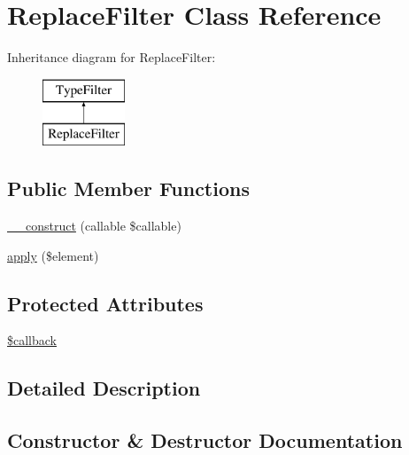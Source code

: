 \hypertarget{class_deep_copy_1_1_type_filter_1_1_replace_filter}{}\section{Replace\+Filter Class Reference}
\label{class_deep_copy_1_1_type_filter_1_1_replace_filter}
Inheritance diagram for Replace\+Filter\+:\begin{figure}[H]
\begin{center}
\leavevmode
\includegraphics[height=2.000000cm]{class_deep_copy_1_1_type_filter_1_1_replace_filter}
\end{center}
\end{figure}
\subsection*{Public Member Functions}
\begin{DoxyCompactItemize}
\item 
\mbox{\hyperlink{class_deep_copy_1_1_type_filter_1_1_replace_filter_aebfa7ad9f5ca8a07ffa97a0685aea51a}{\+\_\+\+\_\+construct}} (callable \$callable)
\item 
\mbox{\hyperlink{class_deep_copy_1_1_type_filter_1_1_replace_filter_a959e75f8f2b305dcf33633745c338176}{apply}} (\$element)
\end{DoxyCompactItemize}
\subsection*{Protected Attributes}
\begin{DoxyCompactItemize}
\item 
\mbox{\hyperlink{class_deep_copy_1_1_type_filter_1_1_replace_filter_abc7c2ac0d93d22f71221e8b60512c860}{\$callback}}
\end{DoxyCompactItemize}


\subsection{Detailed Description}


\subsection{Constructor \& Destructor Documentation}
\mbox{\label{class_deep_copy_1_1_type_filter_1_1_replace_filter_aebfa7ad9f5ca8a07ffa97a0685aea51a}} 

